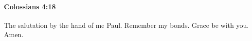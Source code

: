 		\paragraph{Colossians 4:18} %
			\label{COLOSSIANS-4-18}

			The salutation by the hand of me Paul.  Remember my bonds.  Grace be with you.  Amen.

			\begin{framed}
			\scriptsize
				\begin{compactdesc}
					\item[SBLG] 
				\end{compactdesc}
			\end{framed}